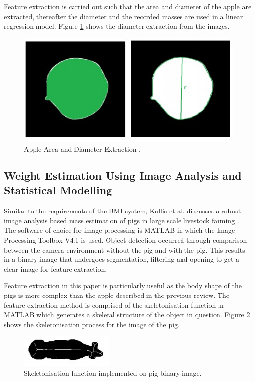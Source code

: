 Feature extraction is carried out such that the area and diameter of the apple are extracted, thereafter the diameter and the recorded masses are used in a linear regression model.
Figure \ref{fig:diameterapples} shows the diameter extraction from the images.
\begin{figure}
    \centering
    \includegraphics[width=\linewidth]{diameterapples.jpg}
    \caption{Apple Area and Diameter Extraction  \cite{comert}.}
    \label{fig:diameterapples}
\end{figure}
\subsection{Weight Estimation Using Image Analysis and Statistical Modelling}
Similar to the requirements of the BMI system, Kollis et al. discusses a robust image analysis based mass estimation of pigs in large scale livestock farming \cite{kollis2007weight}. 
The software of choice for image processing is MATLAB in which the Image Processing Toolbox V4.1 is used.
Object detection occurred through comparison between the camera environment without the pig and with the pig.
This results in a binary image that undergoes segmentation, filtering and opening to get a clear image for feature extraction.

Feature extraction in this paper is particularly useful as the body shape of the pigs is more complex than the apple described in the previous review. 
The feature extraction method is comprised of the skeletonisation function in MATLAB which generates a skeletal structure of the object in question.
Figure \ref{fig:pigskeleton} shows the skeletonisation process for the image of the pig.
\begin{figure}
    \centering
    \includegraphics[width=\linewidth]{pigskeleton.jpg}
    \caption{Skeletonisation function implemented on pig binary image\cite{kollis2007weight}.}
    \label{fig:pigskeleton}
\end{figure}

